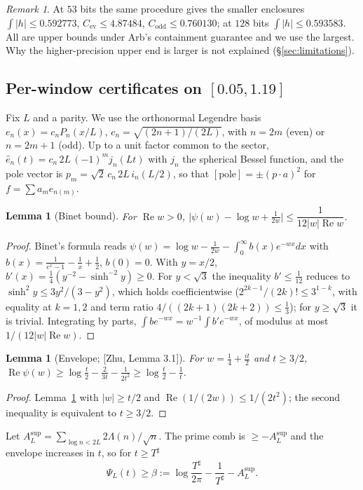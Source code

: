 \documentclass[11pt]{amsart}
\newcommand{\ev}{\mathrm{ev}}
\newcommand{\od}{\mathrm{odd}}
\newcommand{\re}{\operatorname{Re}}
\newcommand{\pole}{\mathrm{pole}}
\newcommand{\Tsh}{T^{\sharp}}
\newtheorem{lemma}[theorem]{Lemma}
\theoremstyle{definition}
\theoremstyle{remark}
\newtheorem{remark}[theorem]{Remark}
\numberwithin{equation}{section}
\begin{document}
\begin{remark}
At $53$ bits the same procedure gives the smaller enclosures $\int|h|\le0.592773$, $C_\ev\le4.87484$, $C_\od\le0.760130$; at $128$ bits $\int|h|\le0.593583$. All are upper bounds under Arb's containment guarantee and we use the largest. Why the higher-precision upper end is larger is not explained (\S\ref{sec:limitations}).
\end{remark}

\subsection{Per-window certificates on $[0.05,1.19]$}\label{sec:piece2cert}
Fix $L$ and a parity. We use the orthonormal Legendre basis $e_n(x)=c_nP_n(x/L)$, $c_n=\sqrt{(2n+1)/(2L)}$, with $n=2m$ (even) or $n=2m+1$ (odd). Up to a unit factor common to the sector, $\hat e_n(t)=c_n\,2L\,(-1)^mj_n(Lt)$ with $j_n$ the spherical Bessel function, and the pole vector is $p_m=\sqrt2\,c_n\,2L\,i_n(L/2)$, so that $[\pole]=\pm(p\cdot a)^2$ for $f=\sum a_me_{n(m)}$.

\begin{lemma}[Binet bound]\label{lem:B}
For $\re w>0$, $\bigl|\psi(w)-\log w+\tfrac1{2w}\bigr|\le\dfrac1{12|w|\re w}$.
\end{lemma}
\begin{proof}
Binet's formula reads $\psi(w)=\log w-\frac1{2w}-\int_0^\infty b(x)e^{-wx}dx$ with $b(x)=\frac1{e^x-1}-\frac1x+\frac12$, $b(0)=0$. With $y=x/2$, $b'(x)=\tfrac14(y^{-2}-\sinh^{-2}y)\ge0$. For $y<\sqrt3$ the inequality $b'\le\tfrac1{12}$ reduces to $\sinh^2y\le3y^2/(3-y^2)$, which holds coefficientwise ($2^{2k-1}/(2k)!\le3^{1-k}$, with equality at $k=1,2$ and term ratio $4/((2k+1)(2k+2))\le\tfrac13$); for $y\ge\sqrt3$ it is trivial. Integrating by parts, $\int be^{-wx}=w^{-1}\int b'e^{-wx}$, of modulus at most $1/(12|w|\re w)$.
\end{proof}

\begin{lemma}[Envelope; {[Zhu, Lemma 3.1]}]\label{lem:E}
For $w=\tfrac14+\tfrac{it}2$ and $t\ge3/2$, $\re\psi(w)\ge\log\tfrac t2-\tfrac2{3t}-\tfrac1{2t^2}\ge\log\tfrac t2-\tfrac1t$.
\end{lemma}
\begin{proof}
Lemma~\ref{lem:B} with $|w|\ge t/2$ and $\re(1/(2w))\le1/(2t^2)$; the second inequality is equivalent to $t\ge3/2$.
\end{proof}

Let $A_L^{\sup}=\sum_{\log n<2L}2\Lambda(n)/\sqrt n$. The prime comb is $\ge-A_L^{\sup}$ and the envelope increases in $t$, so for $t\ge\Tsh$
\begin{equation}\label{eq:beta}
\Psi_L(t)\ge\beta:=\log\frac{\Tsh}{2\pi}-\frac1{\Tsh}-A_L^{\sup}.
\end{equation}
\end{document}
